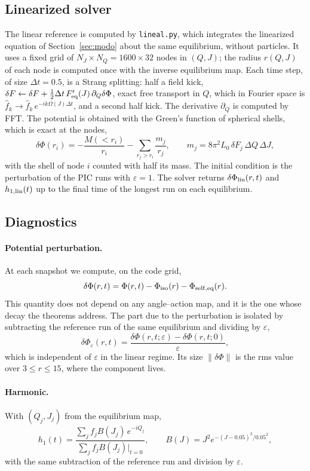 \documentclass[11pt,a4paper]{article}
\begin{document}
\subsection{Linearized solver}
\label{sec:lineal}

The linear reference is computed by \texttt{lineal.py}, which integrates the linearized
equation of Section~\ref{sec:modo} about the same equilibrium, without particles. It
uses a fixed grid of $N_J\times N_Q=1600\times32$ nodes in $(Q,J)$; the radius $r(Q,J)$
of each node is computed once with the inverse equilibrium map. Each time step, of
size $\Delta t=0.5$, is a Strang splitting: half a field kick,
$\delta F\leftarrow\delta F+\tfrac12\Delta t\,F_{\rm eq}'(J)\,\partial_Q\delta\Phi$,
exact free transport in $Q$, which in Fourier space is $\hat f_k\to\hat f_k\,e^{-ik\Omega(J)\Delta t}$, and a second half kick. The derivative $\partial_Q$ is computed by
FFT. The potential is obtained with the Green's function of spherical shells, which is
exact at the nodes,
\[
  \delta\Phi(r_i)=-\frac{M(<r_i)}{r_i}-\sum_{r_j>r_i}\frac{m_j}{r_j},\qquad
  m_j=8\pi^2L_0\,\delta F_j\,\Delta Q\,\Delta J,
\]
with the shell of node $i$ counted with half its mass. The initial condition is the
perturbation of the PIC runs with $\varepsilon=1$. The solver returns
$\delta\Phi_{\rm lin}(r,t)$ and $h_{1,\rm lin}(t)$ up to the final time of the longest
run on each equilibrium.

\subsection{Diagnostics}
\label{sec:medida}

\paragraph{Potential perturbation.} At each snapshot we compute, on the code grid,
\[
  \delta\Phi(r,t)=\Phi(r,t)-\Phi_{\rm iso}(r)-\Phi_{\rm self,eq}(r).
\]
This quantity does not depend on any angle--action map, and it is the one whose decay
the theorems address. The part due to the perturbation is isolated by subtracting the
reference run of the same equilibrium and dividing by $\varepsilon$,
\[
  \delta\Phi_\varepsilon(r,t)=\frac{\delta\Phi(r,t;\varepsilon)-\delta\Phi(r,t;0)}{\varepsilon},
\]
which is independent of $\varepsilon$ in the linear regime. Its size $\|\delta\Phi\|$ is the
rms value over $3\le r\le15$, where the component lives.

\paragraph{Harmonic.} With $(Q_j,J_j)$ from the equilibrium map,
\[
  h_1(t)=\frac{\sum_jf_jB(J_j)\,e^{-iQ_j}}{\sum_jf_jB(J_j)\big|_{t=0}},\qquad B(J)=J^2e^{-(J-0.05)^2/0.05^2},
\]
with the same subtraction of the reference run and division by $\varepsilon$.
\end{document}
